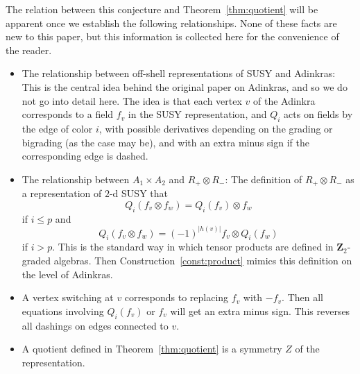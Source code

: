 \documentclass[12pt,twoside,singlespace]{article}
\numberwithin{equation}{section}
\theoremstyle{definition}
\newcommand{\ZZ}{\mathbf{Z}}
\begin{document}
The relation between this conjecture and Theorem~\ref{thm:quotient} will be apparent once we establish the following relationships.  None of these facts are new to this paper, but this information is collected here for the convenience of the reader.
\begin{itemize}
\item The relationship between off-shell representations of SUSY and Adinkras: This is the central idea behind the original paper on Adinkras\cite{d2l:first}, and so we do not go into detail here.  The idea is that each vertex $v$ of the Adinkra corresponds to a field $f_v$ in the SUSY representation, and $Q_i$ acts on fields by the edge of color $i$, with possible derivatives depending on the grading or bigrading (as the case may be), and with an extra minus sign if the corresponding edge is dashed.
\item The relationship between $A_1\times A_2$ and $R_+\otimes R_-$: The definition of $R_+\otimes R_-$ as a representation of $2$-d SUSY that
\[Q_i(f_v\otimes f_w)=Q_i(f_v)\otimes f_w \]
if $i\le p$ and
\[Q_i(f_v\otimes f_w)=(-1)^{|h(v)|}f_v\otimes Q_i(f_w)\]
if $i >p$.  This is the standard way in which tensor products are defined in $\ZZ_2$-graded algebras.\cite{bott_tu,freed}  Then Construction~\ref{const:product} mimics this definition on the level of Adinkras.
\item A vertex switching at $v$ corresponds to replacing $f_v$ with $-f_v$.  Then all equations involving $Q_i(f_v)$ or $f_v$ will get an extra minus sign.  This reverses all dashings on edges connected to $v$.
\item A quotient defined in Theorem~\ref{thm:quotient} is a symmetry $Z$ of the representation.
\end{itemize}



\end{document}
